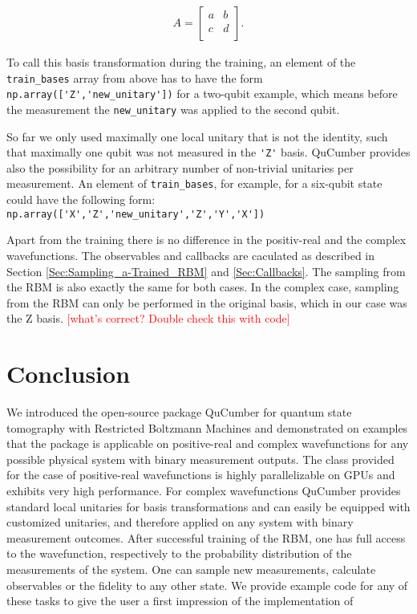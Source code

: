 \documentclass[submission, Phys]{SciPost}
\begin{document}
\begin{align}
	A =
	\begin{bmatrix}
		a & b \\
		c & d \\
	\end{bmatrix}.
\end{align}

To call this basis transformation during the training, an element of the \verb|train_bases| array from above has to have the form
\verb|np.array(['Z','new_unitary'])| for a two-qubit example,
which means before the measurement the \verb|new_unitary| was applied to the second qubit.

So far we only used maximally one local unitary that is not the identity, such that maximally one qubit was not measured in the \verb|'Z'| basis.
QuCumber provides also the possibility for an arbitrary number of non-trivial unitaries per measurement.
An element of \verb|train_bases|, for example, for a six-qubit state could have the following form:
\verb|np.array(['X','Z','new_unitary','Z','Y','X'])|

Apart from the training there is no difference in the positiv-real and the complex wavefunctions. The observables and callbacks are caculated as described in Section \ref{Sec:Sampling_a-Trained_RBM} and \ref{Sec:Callbacks}.
The sampling from the RBM is also exactly the same for both cases.
In the complex case, sampling from the RBM can only be performed in the original basis, which in our case was the Z basis.
\textcolor{red}{[what's correct? Double check this with code]}
%

\section{Conclusion}

We introduced the open-source package QuCumber for quantum state tomography with Restricted Boltzmann Machines and demonstrated on examples that
the package is applicable on positive-real and complex wavefunctions for any possible physical system with binary measurement outputs.
The class provided for the case of positive-real wavefunctions is highly parallelizable on GPUs and exhibits very high performance.
For complex wavefunctions QuCumber provides standard local unitaries for basis transformations
and can easily be equipped with customized unitaries, and therefore applied on any system with binary measurement outcomes.
After successful training of the RBM, one has full access to the wavefunction, respectively to the probability distribution of the measurements of the system.
One can sample new measurements, calculate observables or the fidelity to any other state.
We provide example code for any of these tasks to give the user a first impression of the implementation of
\end{document}
